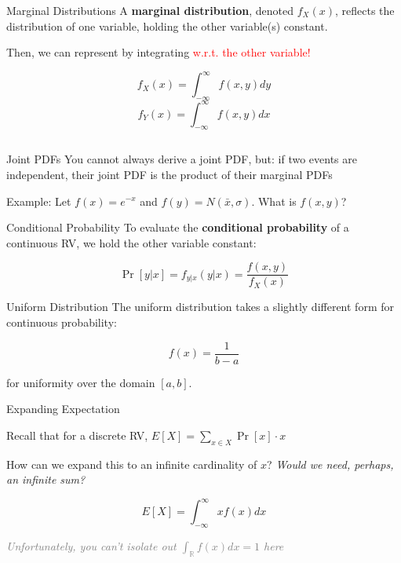 \documentclass[10pt]{beamer}
\begin{document}
\begin{frame}{Marginal Distributions}
    A \textbf{marginal distribution}, denoted $f_X(x)$, reflects the distribution of one variable, holding the other variable(s) constant. \\

    \vspace{1cm}

    Then, we can represent by integrating \textcolor{red}{w.r.t. the other variable!}

    \[f_X(x) = \int_{-\infty}^{\infty} f(x,y) dy\]
    \[f_Y(x) = \int_{-\infty}^\infty f(x,y) dx\]

    \[\]
\end{frame}

\begin{frame}{Joint PDFs}
    You cannot always derive a joint PDF, but: if two events are independent, their joint PDF is the product of their marginal PDFs \\

    \vspace{1cm}

    Example: Let $f(x) = e^{-x}$ and $f(y) = N(\bar{x},\sigma)$. What is $f(x,y)$?
\end{frame}

\begin{frame}{Conditional Probability}
    To evaluate the \textbf{conditional probability} of a continuous RV, we hold the other variable constant:

    \[\Pr[y | x] = f_{y|x} (y|x) = \frac{f(x,y)}{f_X(x)}\]
\end{frame}

\begin{frame}{Uniform Distribution}
    The uniform distribution takes a slightly different form for continuous probability:

    \[f(x) = \frac{1}{b-a}\]

    for uniformity over the domain $[a,b]$.
\end{frame}

\begin{frame}{Expanding Expectation}

Recall that for a discrete RV, $E[X] = \sum_{x \in X} \Pr[x] \cdot x$ \\

\vspace{.5cm}

How can we expand this to an infinite cardinality of $x$? \pause \textit{Would we need, perhaps, an infinite sum?} \pause

\[E[X] = \int_{-\infty}^{\infty} x f(x) dx\]

\textcolor{gray}{\textit{Unfortunately, you can't isolate out $\int_{\mathbb{R}} f(x)dx = 1$ here}}
\end{frame}
\end{document}

